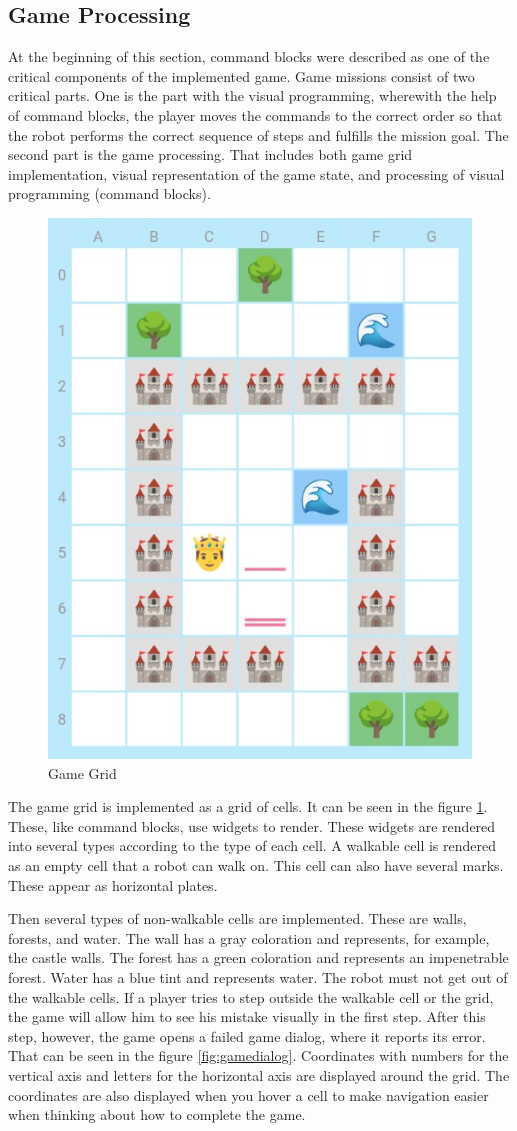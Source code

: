 \subsection{Game Processing}

At the beginning of this section, command blocks were described as one of the critical components of the implemented game.
Game missions consist of two critical parts.
One is the part with the visual programming, wherewith the help of command blocks, the player moves the commands to the correct order so that the robot performs the correct sequence of steps and fulfills the mission goal.
The second part is the game processing.
That includes both game grid implementation, visual representation of the game state, and processing of visual programming (command blocks).

\begin{figure}
    \centering
    \includegraphics[width=0.5\linewidth]{assets/implementation/gamegrid.jpeg}
    \caption{Game Grid}
    \label{fig:gamegrid}
\end{figure}

The game grid is implemented as a grid of cells.
It can be seen in the figure \ref{fig:gamegrid}.
These, like command blocks, use widgets to render.
These widgets are rendered into several types according to the type of each cell.
A walkable cell is rendered as an empty cell that a robot can walk on.
This cell can also have several marks.
These appear as horizontal plates.

Then several types of non-walkable cells are implemented.
These are walls, forests, and water.
The wall has a gray coloration and represents, for example, the castle walls.
The forest has a green coloration and represents an impenetrable forest.
Water has a blue tint and represents water.
The robot must not get out of the walkable cells.
If a player tries to step outside the walkable cell or the grid, the game will allow him to see his mistake visually in the first step.
After this step, however, the game opens a failed game dialog, where it reports its error.
That can be seen in the figure \ref{fig:gamedialog}.
Coordinates with numbers for the vertical axis and letters for the horizontal axis are displayed around the grid.
The coordinates are also displayed when you hover a cell to make navigation easier when thinking about how to complete the game.

